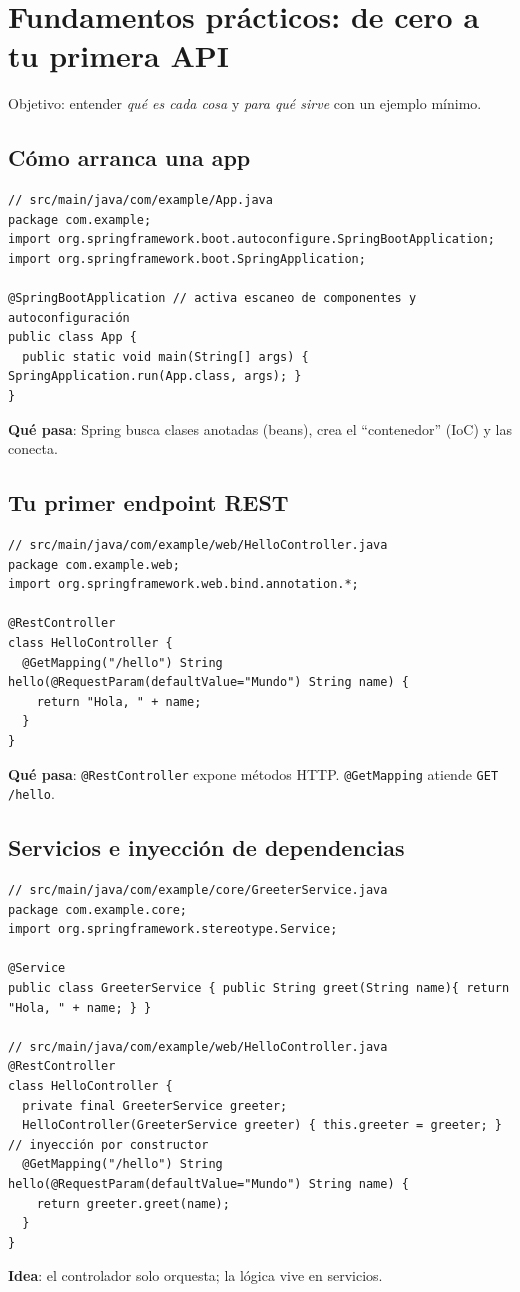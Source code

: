 \documentclass[11pt,a4paper]{article}
\begin{document}
\section{Fundamentos prácticos: de cero a tu primera API}
Objetivo: entender \emph{qué es cada cosa} y \emph{para qué sirve} con un ejemplo mínimo.

\subsection{Cómo arranca una app}
\begin{lstlisting}[style=javastyle, caption={Aplicación mínima}]
// src/main/java/com/example/App.java
package com.example;
import org.springframework.boot.autoconfigure.SpringBootApplication;
import org.springframework.boot.SpringApplication;

@SpringBootApplication // activa escaneo de componentes y autoconfiguración
public class App {
  public static void main(String[] args) { SpringApplication.run(App.class, args); }
}
\end{lstlisting}
\textbf{Qué pasa}: Spring busca clases anotadas (beans), crea el “contenedor” (IoC) y las conecta.

\subsection{Tu primer endpoint REST}
\begin{lstlisting}[style=javastyle, caption={Hola mundo HTTP}]
// src/main/java/com/example/web/HelloController.java
package com.example.web;
import org.springframework.web.bind.annotation.*;

@RestController
class HelloController {
  @GetMapping("/hello") String hello(@RequestParam(defaultValue="Mundo") String name) {
    return "Hola, " + name;
  }
}
\end{lstlisting}
\textbf{Qué pasa}: \texttt{@RestController} expone métodos HTTP. \texttt{@GetMapping} atiende \texttt{GET /hello}.

\subsection{Servicios e inyección de dependencias}
\begin{lstlisting}[style=javastyle, caption={Separar lógica en un servicio}] 
// src/main/java/com/example/core/GreeterService.java
package com.example.core;
import org.springframework.stereotype.Service;

@Service
public class GreeterService { public String greet(String name){ return "Hola, " + name; } }

// src/main/java/com/example/web/HelloController.java
@RestController
class HelloController {
  private final GreeterService greeter;
  HelloController(GreeterService greeter) { this.greeter = greeter; } // inyección por constructor
  @GetMapping("/hello") String hello(@RequestParam(defaultValue="Mundo") String name) {
    return greeter.greet(name);
  }
}
\end{lstlisting}
\textbf{Idea}: el controlador solo orquesta; la lógica vive en servicios.
\end{document}
